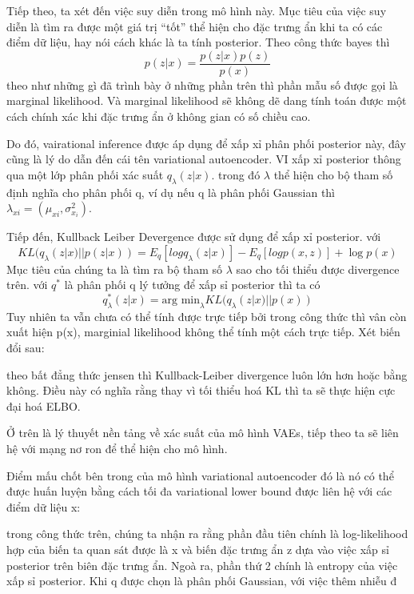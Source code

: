         Tiếp theo, ta xét đến việc suy diễn trong mô hình này. 
        Mục tiêu của việc suy diễn là tìm ra được một giá trị ``tốt'' thể hiện cho đặc trưng ẩn khi ta có các điểm dữ liệu, hay nói cách khác là ta tính posterior.
        Theo công thức bayes thì 
        $$p(z|x) = \frac{p(z|x)p(z)}{p(x)}$$
        theo như những gì đã trình bày ở những phần trên thì phần mẫu số được gọi là marginal likelihood. 
        Và marginal likelihood sẽ không dẽ dang tính toán được một cách chính xác khi đặc trưng ẩn ở không gian có số chiều cao. 

        Do đó, vairational inference được áp dụng để xấp xỉ phân phối posterior này, đây cũng là lý do dẫn đến cái tên variational autoencoder.
        VI xấp xỉ posterior thông qua một lớp phân phối xác suất $q_\lambda(z|x)$.
        trong đó $\lambda$ thể hiện cho bộ tham số định nghĩa cho phân phối q, ví dụ nếu q là phân phối Gaussian thì $\lambda_{xi} = (\mu_{xi},\sigma^2_{x_i})$.
        
        Tiếp đến, Kullback Leiber Devergence được sử dụng để xấp xỉ posterior. 
        với $$KL(q_\lambda(z|x) || p (z|x)) = E_q[log q_\lambda(z|x)] - E_q[log p(x,z)] + \log p(x)$$
        Mục tiêu của chúng ta là tìm ra bộ tham số $\lambda$ sao cho tối thiểu được divergence trên. với $q^*$ là phân phối q lý tưởng để xấp sỉ posterior thì ta có
        $$q^*_\lambda(z|x) = \text{arg min}_\lambda KL(q_\lambda(z|x)|| p(x))$$
        Tuy nhiên ta vẫn chưa có thể tính được trực tiếp bởi trong công thức thì vân còn xuất hiện p(x), marginial likelihood không thể tính một cách trực tiếp. 
        Xét biến đổi sau:


        theo bất đẳng thức jensen thì Kullback-Leiber divergence luôn lớn hơn hoặc bằng không. 
        Điều này có nghĩa rằng thay vì tối thiểu hoá KL thì ta sẽ thực hiện cực đại hoá ELBO.
        
        Ở trên là lý thuyết nền tảng về xác suất của mô hình VAEs, tiếp theo ta sẽ liên hệ với mạng nơ ron để thể hiện cho mô hình.



        Điểm mấu chốt bên trong của mô hình variational autoencoder đó là nó có thể được huấn luyện bằng cách tối đa variational lower bound được liên hệ với các điểm dữ liệu x:

        trong công thức trên, chúng ta nhận ra rằng phần đầu tiên chính là log-likelihood hợp của biến ta quan sát được là x và biến đặc trưng ẩn z dựa vào việc xấp sỉ posterior trên biên đặc trưng ẩn. 
        Ngoà ra, phần thứ 2 chính là entropy của việc xấp sỉ posterior. 
        Khi q được chọn là phân phối Gaussian, với việc thêm nhiễu đ

  
        
        

       

